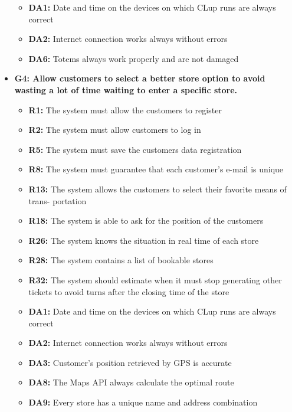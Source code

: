 \documentclass{article}
\begin{document}
\begin{itemize}
\begin{itemize}
				\item {\bfseries DA1:} Date and time on the devices on which CLup runs are always correct
				\item {\bfseries DA2:} Internet connection works always without errors
				\item {\bfseries DA6:} Totems always work properly and are not damaged
				
				\end{itemize}

\item {\bfseries G4: Allow customers to select a better store option to avoid wasting a lot of time waiting to enter a specific store.}	

			\begin{itemize}
				\item {\bfseries R1:} The system must allow the customers to register
				\item {\bfseries R2:} The system must allow customers to log in
				\item {\bfseries R5:} The system must save the customers data registration
				\item {\bfseries R8:} The system must guarantee that each customer's e-mail is unique
				\item {\bfseries R13:} The system allows the customers to select their favorite means of trans-
portation
				\item {\bfseries R18:} The system is able to ask for the position of the customers
				\item {\bfseries R26:} The system knows the situation in real time of each store
				\item {\bfseries R28:} The system contains a list of bookable stores
				\item {\bfseries R32:} The system should estimate when it must stop generating other tickets to
avoid turns after the closing time of the store

				\item {\bfseries DA1:} Date and time on the devices on which CLup runs are always correct
				\item {\bfseries DA2:} Internet connection works always without errors
				\item {\bfseries DA3:} Customer’s position retrieved by GPS is accurate
				\item {\bfseries DA8:} The Maps API always calculate the optimal route 
				\item {\bfseries DA9:} Every store has a unique name and address combination
				

\end{itemize}
\end{itemize}
\end{document}
